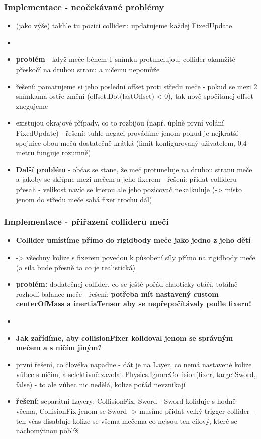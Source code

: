\subsubsection*{Implementace - neočekávané problémy}
\begin{itemize}
  \item (jako výše) takhle tu pozici collideru updatujeme každej FixedUpdate
  \item 
  \item \textbf{problém} - když meče během 1 snímku protunelujou, collider okamžitě přeskočí na druhou stranu a ničemu nepomůže
  \item řešení: pamatujeme si jeho poslední offset proti středu meče - pokud se mezi 2 snímkama ostře změní (offset.Dot(lastOffset) < 0), tak nově spočítanej offset znegujeme
  \item existujou okrajové případy, co to rozbijou (např. úplně první volání FixedUpdate) - řešení: tuhle negaci provádíme jenom pokud je nejkratší spojnice obou mečů dostatečně krátká (limit konfigurovaný uživatelem, 0.4 metru funguje rozumně)
  \item \textbf{Další problém} - občas se stane, že meč protuneluje na druhou stranu meče a jakoby se skřípne mezi mečem a jeho fixerem - řešení: přidat collideru přesah - velikost navíc se kterou ale jeho pozicovač nekalkuluje (-> místo jenom do středu meče sahá fixer trochu dál)
\end{itemize}

\subsubsection*{Implementace - přiřazení collideru meči}
\begin{itemize}
  \item \textbf{Collider umístíme přímo do rigidbody meče jako jedno z jeho dětí}
  \item -> všechny kolize s fixerem povedou k působení síly přímo na rigidbody meče (a síla bude přesně ta co je realistická)
  \item \textbf{problém:} dodatečnej collider, co se ještě pořád chaoticky otáčí, totálně rozhodí balance meče - řešení: \textbf{potřeba mít nastavený custom centerOfMass a inertiaTensor aby se nepřepočítávaly podle fixeru!} 
  \item 
  \item \textbf{Jak zařídíme, aby collisionFixer kolidoval jenom se správným mečem a s ničím jiným?}
  \item první řešení, co člověka napadne - dát je na Layer, co nemá nastavené kolize vůbec s ničím, a selektivně zavolat Physics.IgnoreCollision(fixer, targetSword, false) - to ale vůbec nic nedělá, kolize pořád nevznikají
  \item \textbf{řešení:} separátní Layery: CollisionFix, Sword - Sword koliduje s hodně věcma, CollisionFix jenom se Sword -> musíme přidat velký trigger collider - ten včas disabluje kolize se všema mečema co nejsou ten cílový, které se nachomýtnou poblíž
\end{itemize}


